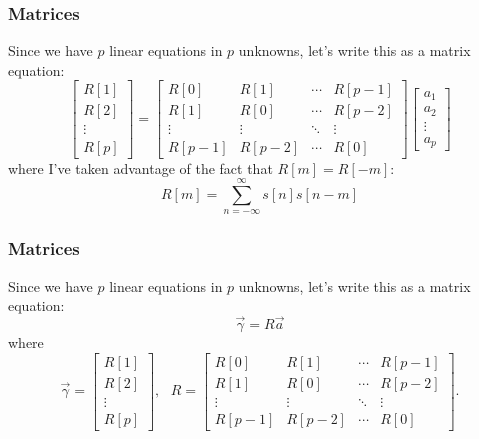\documentclass{beamer}
\begin{document}
\begin{frame}
  \frametitle{Matrices}

  Since we have $p$ linear equations in $p$ unknowns, let's write this
  as a matrix equation:
  \begin{displaymath}
    \left[\begin{array}{c}R[1]\\ R[2]\\\vdots\\ R[p]\end{array}\right] =
    \left[\begin{array}{cccc} R[0] & R[1] &  \cdots & R[p-1] \\
        R[1] & R[0] & \cdots & R[p-2] \\
        \vdots & \vdots & \ddots & \vdots \\
        R[p-1] & R[p-2] & \cdots & R[0] \end{array}\right]
    \left[\begin{array}{c}a_1\\a_2\\\vdots\\a_p\end{array}\right]
  \end{displaymath}
  where I've taken advantage of the fact that $R[m]=R[-m]$:
  \begin{displaymath}
    R[m] = \sum_{n=-\infty}^\infty s[n]s[n-m]
  \end{displaymath}
\end{frame}
      
\begin{frame}
  \frametitle{Matrices}

  Since we have $p$ linear equations in $p$ unknowns, let's write this
  as a matrix equation:
  \begin{displaymath}
    \vec\gamma = R \vec{a}
  \end{displaymath}
  where
  \begin{displaymath}
    \vec\gamma = \left[\begin{array}{c}R[1]\\ R[2]\\\vdots\\ R[p]\end{array}\right],~~~
    R = \left[\begin{array}{cccc} R[0] & R[1] &  \cdots & R[p-1] \\
        R[1] & R[0] & \cdots & R[p-2] \\
        \vdots & \vdots & \ddots & \vdots \\
        R[p-1] & R[p-2] & \cdots & R[0] \end{array}\right].
  \end{displaymath}
\end{frame}
\end{document}
